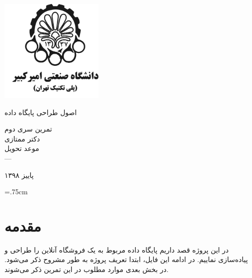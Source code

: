 \documentclass[12pt,a4paper]{article}
\begin{document}
\thispagestyle{empty}
\vspace*{-28mm}
\centerline{\includegraphics[height=5cm]{logo.png}}
\begin{center}
\vspace{-2mm}
{\large
اصول طراحی پایگاه داده
\\[2.1cm]
}

{\Large
تمرین سری دوم
\\[2cm]

دکتر ممتازی
\\[1.5cm]
\large 
موعد تحویل
\\[0.5cm]
---
}
\baselineskip=1cm

{\large
پاییز ۱۳۹۸
}
\end{center}
\newpage
\baselineskip=1cm
\baselineskip=.75cm
\newpage 

\section{مقدمه}
در این پروژه قصد داریم پایگاه داده مربوط به یک فروشگاه آنلاین را طراحی و پیاده‌سازی نماییم.
در ادامه این فایل، ابتدا تعریف پروژه به طور مشروح ذکر می‌شود. در بخش بعدی موارد مطلوب در این تمرین ذکر می‌شوند.
\end{document}
